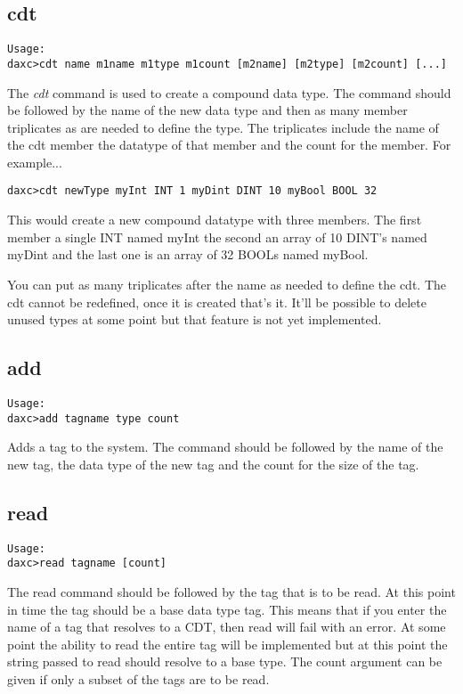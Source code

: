\subsection{cdt}
\begin{verbatim}
Usage:
daxc>cdt name m1name m1type m1count [m2name] [m2type] [m2count] [...]
\end{verbatim}
The \textit{cdt} command is used to create a compound data type.  The command should be followed by the name of the new data type and then as many member triplicates as are needed to define the type.  The triplicates include the name of the cdt member the datatype of that member and the count for the member.  For example...

\begin{verbatim}
daxc>cdt newType myInt INT 1 myDint DINT 10 myBool BOOL 32
\end{verbatim}

This would create a new compound datatype with three members.  The first member a single INT named myInt the second an array of 10 DINT's named myDint and the last one is an array of 32 BOOLs named myBool.

You can put as many triplicates after the name as needed to define the cdt.  The cdt cannot be redefined, once it is created that's it.  It'll be possible to delete unused types at some point but that feature is not yet implemented.

\subsection{add}
\begin{verbatim}
Usage:
daxc>add tagname type count
\end{verbatim}

Adds a tag to the system.  The command should be followed by the name of the new tag, the data type of the new tag and the count for the size of the tag.

\subsection{read}
\begin{verbatim}
Usage:
daxc>read tagname [count]
\end{verbatim}

The read command should be followed by the tag that is to be read.  At this point in time the tag should be a base data type tag.  This means that if you enter the name of a tag that resolves to a CDT, then read will fail with an error.  At some point the ability to read the entire tag will be implemented but at this point the string passed to read should resolve to a base type.  The count argument can be given if only a subset of the tags are to be read.

